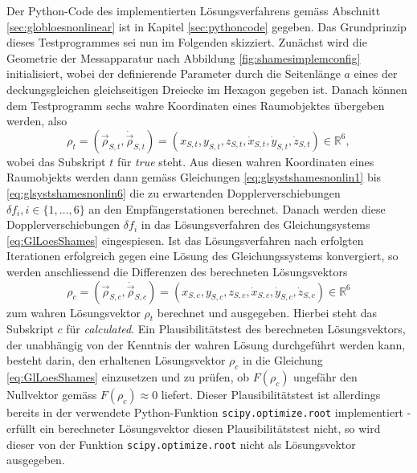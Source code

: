 \documentclass[a4paper,12pt]{article}
\numberwithin{equation}{section}
\begin{document}
Der Python-Code des implementierten Lösungsverfahrens gemäss Abschnitt \ref{sec:globloesnonlinear} ist in Kapitel \ref{sec:pythoncode} gegeben. Das Grundprinzip dieses Testprogrammes sei nun im Folgenden skizziert. Zunächst wird die Geometrie der Messapparatur nach Abbildung \ref{fig:shamesimplemconfig} initialisiert, wobei der definierende Parameter durch die Seitenlänge $a$ eines der deckungsgleichen gleichseitigen Dreiecke im Hexagon gegeben ist. Danach können dem Testprogramm sechs wahre Koordinaten eines Raumobjektes übergeben werden, also \begin{equation}
\rho_{t} = (\vec{\rho}_{S,t},\dot{\vec{\rho}}_{S,t}) = (x_{S,t},y_{S,t},z_{S,t},\dot{x}_{S,t},\dot{y}_{S,t},\dot{z}_{S,t}) \in \mathbb{R}^6,
\end{equation} wobei das Subskript $t$ für \textit{true} steht. Aus diesen wahren Koordinaten eines Raumobjekts werden dann gemäss Gleichungen \eqref{eq:glsystshamesnonlin1} bis \eqref{eq:glsystshamesnonlin6} die zu erwartenden Dopplerverschiebungen $\delta f_i, i \in \{1,\dots,6\}$ an den Empfängerstationen berechnet. Danach werden diese Dopplerverschiebungen $\delta f_i$ in das Lösungsverfahren des Gleichungsystems \eqref{eq:GlLoesShames} eingespiesen. Ist das Lösungsverfahren nach erfolgten Iterationen erfolgreich gegen eine Lösung des Gleichungssystems konvergiert, so werden anschliessend die Differenzen des berechneten Lösungsvektors \begin{equation}
\rho_{c} = (\vec{\rho}_{S,c},\dot{\vec{\rho}}_{S,c}) = (x_{S,c},y_{S,c},z_{S,c},\dot{x}_{S,c},\dot{y}_{S,c},\dot{z}_{S,c}) \in \mathbb{R}^6
\end{equation} zum wahren Lösungsvektor $\rho_t$ berechnet und ausgegeben. Hierbei steht das Subskript $c$ für \textit{calculated}. Ein Plausibilitätstest des berechneten Lösungsvektors, der unabhängig von der Kenntnis der wahren Lösung durchgeführt werden kann, besteht darin, den erhaltenen Lösungsvektor $\rho_c$ in die Gleichung \eqref{eq:GlLoesShames} einzusetzen und zu prüfen, ob $F(\rho_c)$ ungefähr den Nullvektor gemäss $F(\rho_c) \approx 0$ liefert. Dieser Plausibilitätstest ist allerdings bereits in der verwendete Python-Funktion \verb|scipy.optimize.root| implementiert - erfüllt ein berechneter Lösungsvektor diesen Plausibilitätstest nicht, so wird dieser von der Funktion \verb|scipy.optimize.root| nicht als Lösungsvektor ausgegeben.
\end{document}
